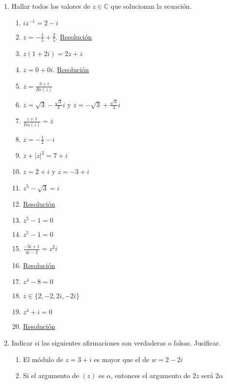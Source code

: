\documentclass[a4paper]{article}
\newcommand{\answer}{\item[**]}
\newcommand{\exercise}{\item}
\newcommand{\df}[2]{\displaystyle\frac{#1}{#2}}
\newcommand{\conj}[1]{\overline{#1}}
\begin{document}
\begin{enumerate}
\begin{multicols}{2}
\begin{enumerate} [label=(\alph*)]
	\end{enumerate}
	\end{multicols}

	\exercise Hallar todos los valores de $z \in \mathbb{C}$ que solucionan la ecuación.
	\begin{multicols}{2}
	\begin{enumerate} [label=(\alph*)]
		
		\item $iz^{-1}=2-i$
		\answer $z=-\df{1}{5}+\df{2}{5}$. \href{https://youtu.be/Yrh7otV4DzI}{Resolución}

		\item $z(1+2i)=2z+\conj{z}$
		\answer $z=0+0i$. \href{https://youtu.be/erb6iZXGQw4}{Resolución}

		\item $\conj{z}=\df{3+i}{Re(z)}$
		\answer $z=\sqrt{3}-\df{\sqrt{3}}{3}i$ y $z=-\sqrt{3}+\df{\sqrt{3}}{3}i$

		\item $\df{z+1}{Im(z)}=\conj{z}$
		\answer $z=-\df{1}{2}-i$

		\item $z+|z|^2=7+i$
		\answer $z=2+i$ y $z=-3+i$

		\item $z^5-\sqrt{3}=i$
		\answer \href{https://youtu.be/plpDsgzooH4}{Resolución}

		\item $z^5-1=0$
		\answer $z^5-1=0$

		\item $\df{-3i+1}{4i-2}=z^2i$
		\answer \href{https://youtu.be/8z_3vpIabLI}{Resolución}

		\item $z^4-8=0$
		\answer $z \in \{2,-2,2i,-2i\}$

		\item $z^4+i=0$
		\answer \href{https://youtu.be/7ggnxlrUnrk}{Resolución}

	\end{enumerate}
	\end{multicols}

	\exercise Indicar si las siguientes afirmaciones son verdaderas o falsas. Jusificar.
	\begin{enumerate} [label=(\alph*)]
		
		\item El módulo de $z=3+i$ es mayor que el de $w=2-2i$

		\item Si el argumento de $(z)$ es $\alpha$, entonces el argumento de $2z$ será $2\alpha$ 


\end{enumerate}
\end{enumerate}
\end{document}
